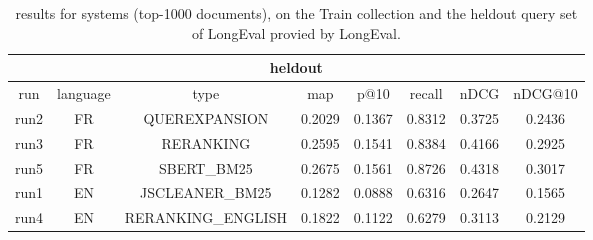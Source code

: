 
\begin{table}[h!]
    \centering
    \caption{results for systems (top-1000 documents), on the Train collection and the heldout query set of LongEval provied by LongEval.}
    \begin{tabular}{ |c|c|c|c|c|c|c|c| }
        \hline
        \hline
        \multicolumn{8}{|c|}{heldout} \\ \hline
        run  & language & type & map & p@10 & recall & nDCG & nDCG@10 \\ \hline
        run2 &   FR   & QUEREXPANSION & 0.2029 & 0.1367 & 0.8312 & 0.3725 & 0.2436 \\
        run3 &   FR   & RERANKING & 0.2595 & 0.1541 & 0.8384 & 0.4166 & 0.2925 \\
        run5 &   FR   & SBERT\_BM25 & 0.2675 & 0.1561 & 0.8726 & 0.4318 & 0.3017 \\
        \hline
        run1 &   EN   & JSCLEANER\_BM25 & 0.1282 & 0.0888 & 0.6316 & 0.2647 & 0.1565 \\
        run4 &   EN   & RERANKING\_ENGLISH & 0.1822 & 0.1122 & 0.6279 & 0.3113 & 0.2129 \\
        \hline
    \end{tabular}
    \label{tab:results_submission_heldout}
\end{table}

